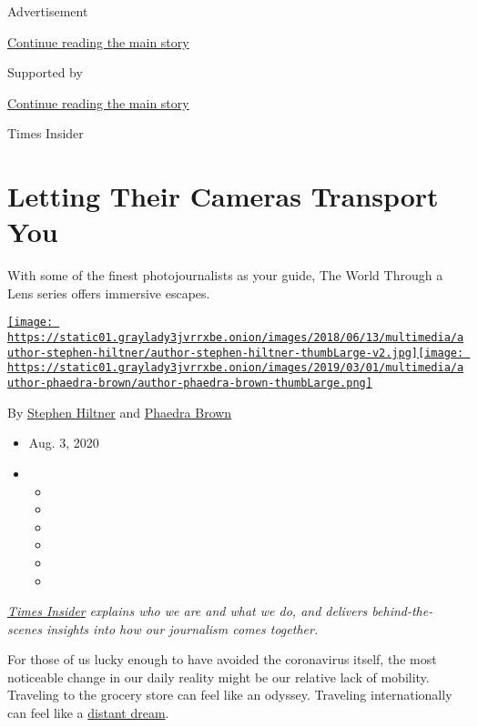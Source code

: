 Advertisement

\protect\hyperlink{after-top}{Continue reading the main story}

Supported by

\protect\hyperlink{after-sponsor}{Continue reading the main story}

Times Insider

\hypertarget{letting-their-cameras-transport-you}{%
\section{Letting Their Cameras Transport
You}\label{letting-their-cameras-transport-you}}

With some of the finest photojournalists as your guide, The World
Through a Lens series offers immersive escapes.

\href{https://www.nytimes3xbfgragh.onion/by/stephen-hiltner}{\texttt{[image: https://static01.graylady3jvrrxbe.onion/images/2018/06/13/multimedia/author-stephen-hiltner/author-stephen-hiltner-thumbLarge-v2.jpg]}}\href{https://www.nytimes3xbfgragh.onion/by/phaedra-brown}{\texttt{[image: https://static01.graylady3jvrrxbe.onion/images/2019/03/01/multimedia/author-phaedra-brown/author-phaedra-brown-thumbLarge.png]}}

By \href{https://www.nytimes3xbfgragh.onion/by/stephen-hiltner}{Stephen
Hiltner} and
\href{https://www.nytimes3xbfgragh.onion/by/phaedra-brown}{Phaedra
Brown}

\begin{itemize}
\item
  Aug. 3, 2020
\item
  \begin{itemize}
  \item
  \item
  \item
  \item
  \item
  \item
  \end{itemize}
\end{itemize}

\href{https://www.nytimes3xbfgragh.onion/series/times-insider}{\emph{Times
Insider}} \emph{explains who we are and what we do, and delivers
behind-the-scenes insights into how our journalism comes together.}

For those of us lucky enough to have avoided the coronavirus itself, the
most noticeable change in our daily reality might be our relative lack
of mobility. Traveling to the grocery store can feel like an odyssey.
Traveling internationally can feel like a
\href{https://www.nytimes3xbfgragh.onion/2020/07/28/travel/future-travel-bucket-list-coronavirus.html}{distant
dream}.

